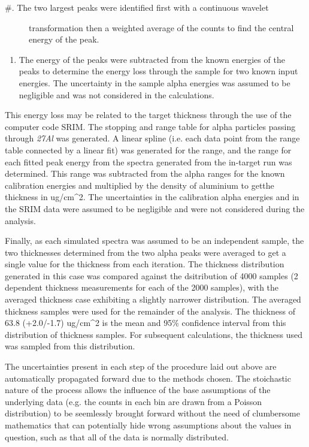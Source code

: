 \begin{description}
\item[\#. The two largest peaks were identified first with a continuous
wavelet]
transformation then a weighted average of the counts to find the central
energy of the peak.
\end{description}

\begin{enumerate}
\tightlist
\item
  The energy of the peaks were subtracted from the known energies of the
  peaks to determine the energy loss through the sample for two known
  input energies. The uncertainty in the sample alpha energies was
  assumed to be negligible and was not considered in the calculations.
\end{enumerate}

This energy loss may be related to the target thickness through the use
of the computer code SRIM. The stopping and range table for alpha
particles passing through \emph{27Al} was generated. A linear spline
(i.e. each data point from the range table connected by a linear fit)
was generated for the range, and the range for each fitted peak energy
from the spectra generated from the in-target run was determined. This
range was subtracted from the alpha ranges for the known calibration
energies and multiplied by the density of aluminium to getthe thickness
in ug/cm\^{}2. The uncertainties in the calibration alpha energies and
in the SRIM data were assumed to be negligible and were not considered
during the analysis.

Finally, as each simulated spectra was assumed to be an independent
sample, the two thicknesses determined from the two alpha peaks were
averaged to get a single value for the thickness from each iteration.
The thickness distribution generated in this case was compared against
the dsitribution of 4000 samples (2 dependent thickness measurements for
each of the 2000 samples), with the averaged thickness case exhibiting a
slightly narrower distribution. The averaged thickness samples were used
for the remainder of the analysis. The thickness of 63.8 (+2.0/-1.7)
ug/cm\^{}2 is the mean and 95\% confidence interval from this
distribution of thickness samples. For subsequent calculations, the
thickness used was sampled from this distribution.

The uncertainties present in each step of the procedure laid out above
are automatically propagated forward due to the methods chosen. The
stoichastic nature of the process allows the influence of the base
assumptions of the underlying data (e.g. the counts in each bin are
drawn from a Poisson distribution) to be seemlessly brought forward
without the need of clumbersome mathematics that can potentially hide
wrong assumptions about the values in question, such as that all of the
data is normally distributed.

